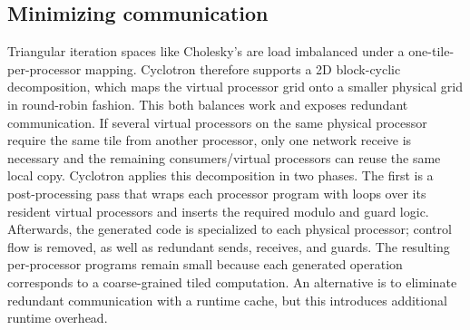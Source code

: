 \documentclass[sigplan, nonacm]{acmart}
\begin{document}

\subsection{Minimizing communication}
\label{sec:block-cyclic}


Triangular iteration spaces like Cholesky’s are load imbalanced under a one-tile-per-processor mapping. Cyclotron therefore supports a 2D block-cyclic decomposition, which maps the virtual processor grid onto a smaller physical grid in round-robin fashion. This both balances work and exposes redundant communication. If several virtual processors on the same physical processor require the same tile from another processor, only one network receive is necessary and the remaining consumers/virtual processors  can reuse the same local copy. Cyclotron applies this decomposition in two phases. The first is a post-processing pass that wraps each processor program with loops over its resident virtual processors and inserts the required modulo and guard logic. Afterwards, the generated code is specialized to each physical processor; control flow is removed, as well as redundant sends, receives, and guards. The resulting per-processor programs remain small because each generated operation corresponds to a coarse-grained tiled computation. An alternative is to eliminate redundant communication with a runtime cache, but this introduces additional runtime overhead.
\end{document}
